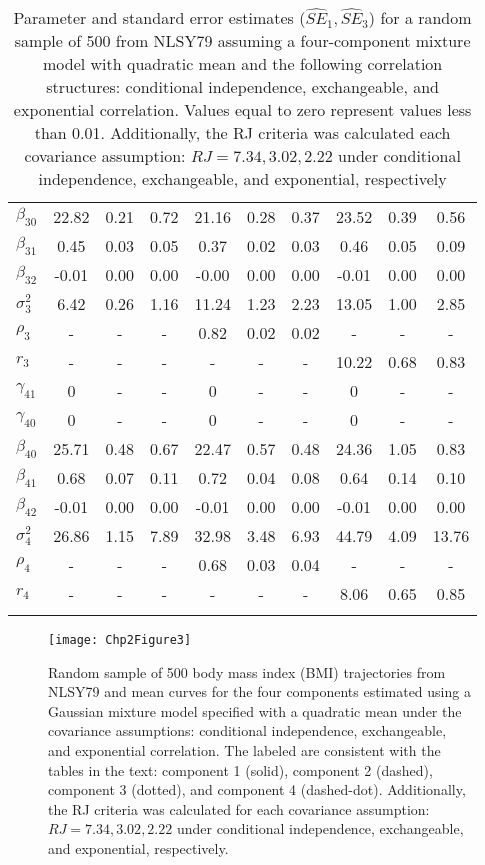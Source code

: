 \begin{table}[ht]
\begin{tabular}{lccccccccc}
  $\beta_{30}$ & 22.82 & 0.21 & 0.72 & 21.16 & 0.28 & 0.37 & 23.52 & 0.39 & 0.56 \\ 
  $\beta_{31}$ & 0.45 & 0.03 & 0.05 & 0.37 & 0.02 & 0.03 & 0.46 & 0.05 & 0.09 \\ 
  $\beta_{32}$ & -0.01 & 0.00 & 0.00 & -0.00 & 0.00 & 0.00 & -0.01 & 0.00 & 0.00 \\ 
  $\sigma_3^2$ & 6.42 & 0.26 & 1.16 & 11.24 & 1.23 & 2.23 & 13.05 & 1.00 & 2.85 \\ 
  $\rho_3$ & - & - & - & 0.82 & 0.02 & 0.02 & - & - & - \\ 
  $r_3$ & - & - & - & - & - & - & 10.22 & 0.68 & 0.83 \\ 
  $\gamma_{41}$ & 0 & - & - & 0 & - & - & 0 & - & - \\ 
  $\gamma_{40}$ & 0 & - & - & 0 & - & - & 0 & - & - \\ 
  $\beta_{40}$ & 25.71 & 0.48 & 0.67 & 22.47 & 0.57 & 0.48 & 24.36 & 1.05 & 0.83 \\ 
  $\beta_{41}$ & 0.68 & 0.07 & 0.11 & 0.72 & 0.04 & 0.08 & 0.64 & 0.14 & 0.10 \\ 
  $\beta_{42}$ & -0.01 & 0.00 & 0.00 & -0.01 & 0.00 & 0.00 & -0.01 & 0.00 & 0.00 \\ 
  $\sigma_4^2$ & 26.86 & 1.15 & 7.89 & 32.98 & 3.48 & 6.93 & 44.79 & 4.09 & 13.76 \\ 
  $\rho_4$ & - & - & - & 0.68 & 0.03 & 0.04 & - & - & - \\ 
  $r_4$ & - & - & - & - & - & - & 8.06 & 0.65 & 0.85 \\ 
   \thickhline\end{tabular}
\caption{Parameter and standard error estimates ($\widehat{SE}_{1},\widehat{SE}_{3}$) for a random sample of 500 from NLSY79 assuming a four-component mixture model with quadratic mean and the following correlation structures: conditional independence, exchangeable, and exponential correlation. Values equal to zero represent values less than 0.01. Additionally, the RJ criteria was calculated each covariance assumption: $RJ=7.34, 3.02, 2.22$ under conditional independence, exchangeable, and exponential, respectively}
\label{tab:dat}

\end{table}

\begin{figure}[ht]
\centering
\texttt{[image: Chp2Figure3]}
\caption{Random sample of 500 body mass index (BMI) trajectories from NLSY79 and mean curves for the four components estimated using a Gaussian mixture model specified with a quadratic mean under the covariance assumptions: conditional independence, exchangeable, and exponential correlation. The labeled are consistent with the tables in the text: component 1 (solid), component 2 (dashed), component 3 (dotted), and component 4 (dashed-dot). Additionally, the RJ criteria was calculated for each covariance assumption: $RJ =7.34,3.02,2.22$ under conditional independence, exchangeable, and exponential, respectively.}
\label{fig:2-3}
\end{figure}

